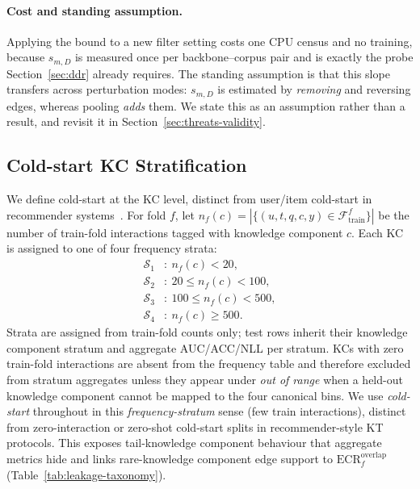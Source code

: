 \documentclass[preprint,10pt,doubleblind]{elsarticle}
\newcommand{\KC}{knowledge component}
\begin{document}
\paragraph{Cost and standing assumption.}
Applying the bound to a new filter setting costs one CPU census and no
training, because $s_{m,D}$ is measured once per backbone--corpus pair and is
exactly the probe Section~\ref{sec:ddr} already requires. The standing
assumption is that this slope transfers across perturbation modes: $s_{m,D}$ is
estimated by \emph{removing} and reversing edges, whereas pooling \emph{adds}
them. We state this as an assumption rather than a result, and revisit it in
Section~\ref{sec:threats-validity}.

\subsection{Cold-start KC Stratification}
\label{sec:cold-start}
We define cold-start at the KC level, distinct from user/item
cold-start in recommender systems~\cite{schein2002coldstart}. For fold
$f$, let $n_f(c)=|\{(u,t,q,c,y)\in\mathcal{F}_{\text{train}}^f\}|$ be
the number of train-fold interactions tagged with \KC{} $c$. Each KC
is assigned to one of four frequency strata:
\[
\begin{aligned}
\mathcal{S}_1&:\ n_f(c)<20,\\
\mathcal{S}_2&:\ 20\le n_f(c)<100,\\
\mathcal{S}_3&:\ 100\le n_f(c)<500,\\
\mathcal{S}_4&:\ n_f(c)\ge 500.
\end{aligned}
\]
Strata are assigned from train-fold counts only; test rows inherit their
\KC{} stratum and aggregate AUC/ACC/NLL per stratum. KCs with zero train-fold
interactions are absent from the frequency table and therefore excluded from
stratum aggregates unless they appear under \emph{out of range} when a held-out
\KC{} cannot be mapped to the four canonical bins. We use \emph{cold-start}
throughout in this \emph{frequency-stratum} sense (few train interactions),
distinct from zero-interaction or zero-shot cold-start splits in recommender-style
KT protocols. This exposes tail-\KC{}
behaviour that aggregate metrics hide and links rare-\KC{} edge support to
$\mathrm{ECR}^{\mathrm{overlap}}_f$ (Table~\ref{tab:leakage-taxonomy}).
\end{document}
